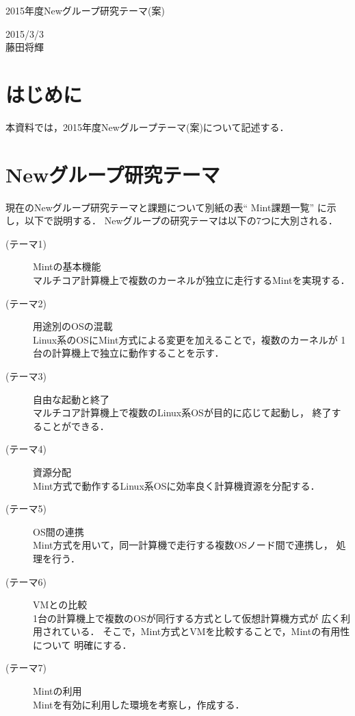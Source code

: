 \documentclass[12pt]{jsarticle}
\begin{document}

\begin{center}
{\LARGE 2015年度Newグループ研究テーマ(案)}
\end{center}

\begin{flushright}
  2015/3/3\\
  藤田将輝
\end{flushright}
\section{はじめに}
本資料では，2015年度Newグループテーマ(案)について記述する．
\section{Newグループ研究テーマ}
現在のNewグループ研究テーマと課題について別紙の表“ Mint課題一覧”
に示し，以下で説明する．
Newグループの研究テーマは以下の7つに大別される．
\begin{description}
    \item[(テーマ1)] Mintの基本機能\\
        マルチコア計算機上で複数のカーネルが独立に走行するMintを実現する．
    \item[(テーマ2)] 用途別のOSの混載\\
        Linux系のOSにMint方式による変更を加えることで，複数のカーネルが
        1台の計算機上で独立に動作することを示す．
    \item[(テーマ3)] 自由な起動と終了\\
        マルチコア計算機上で複数のLinux系OSが目的に応じて起動し，
        終了することができる．
    \item[(テーマ4)] 資源分配\\
        Mint方式で動作するLinux系OSに効率良く計算機資源を分配する．
    \item[(テーマ5)] OS間の連携\\
        Mint方式を用いて，同一計算機で走行する複数OSノード間で連携し，
        処理を行う．
    \item[(テーマ6)] VMとの比較\\
        1台の計算機上で複数のOSが同行する方式として仮想計算機方式が
        広く利用されている．
        そこで，Mint方式とVMを比較することで，Mintの有用性について
        明確にする．
    \item[(テーマ7)] Mintの利用\\
        Mintを有効に利用した環境を考察し，作成する．
\end{description}
\end{document}
